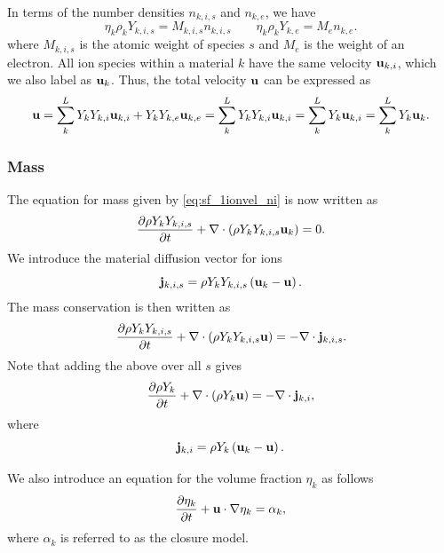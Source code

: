 \documentclass[a4paper,11pt]{report}
\begin{document}
In terms of the number densities $n_{k,i,s}$ and $n_{k,e}$, we have
\begin{equation}
    \label{eq:mm_mass_number_densities}
    \eta_k \rho_k Y_{k,i,s} = M_{k,i,s} n_{k,i,s} \qquad \eta_k \rho_k Y_{k,e} = M_e n_{k,e}.
\end{equation}
where $M_{k,i,s}$ is the atomic weight of species $s$ and $M_e$ is the weight of an electron. All ion species within a material $k$ have the same velocity $\mathbf{u}_{k,i}$, which we also label as $\mathbf{u}_k$. Thus, the total velocity $\mathbf{u}$ can be expressed as
\begin{equation}
    \label{eq:mm_common_vel}
    \mathbf{u} = \sum_k^L Y_k Y_{k,i} \mathbf{u}_{k,i} + Y_k Y_{k,e} \mathbf{u}_{k,e} = \sum_k^L Y_k Y_{k,i} \mathbf{u}_{k,i} = \sum_k^L Y_k \mathbf{u}_{k,i} = \sum_k^L Y_k \mathbf{u}_k.
\end{equation}

\subsubsection{Mass}

The equation for mass given by \cref{eq:sf_1ionvel_ni} is now written as
\begin{equation*}
    \frac{\partial \rho Y_k Y_{k,i,s}}{\partial t} + \nabla \cdot \left( \rho Y_k Y_{k,i,s} \mathbf{u}_k \right) = 0.
\end{equation*}
We introduce the material diffusion vector for ions 
\begin{equation}
    \label{eq:mm_mat_diffusion_species}
    \mathbf{j}_{k,i,s} = \rho Y_k Y_{k,i,s} \left( \mathbf{u}_k - \mathbf{u} \right). 
\end{equation}
The mass conservation is then written as
\begin{equation*}
    \frac{\partial \rho Y_k Y_{k,i,s}}{\partial t} + \nabla \cdot \left( \rho Y_k Y_{k,i,s} \mathbf{u} \right) = - \nabla \cdot \mathbf{j}_{k,i,s}.
\end{equation*}
Note that adding the above over all $s$ gives
\begin{equation*}
    \frac{\partial \rho Y_k}{\partial t} + \nabla \cdot \left( \rho Y_k \mathbf{u} \right) = - \nabla \cdot \mathbf{j}_{k,i},
\end{equation*}
where
\begin{equation}
    \label{eq:mm_mat_diffusion}
    \mathbf{j}_{k,i} = \rho Y_k \left( \mathbf{u}_k - \mathbf{u} \right).
\end{equation}

We also introduce an equation for the volume fraction $\eta_k$ as follows
\begin{equation*}
    \frac{\partial \eta_k}{\partial t} + \mathbf{u} \cdot \nabla \eta_k = \alpha_k,
\end{equation*}
where $\alpha_k$ is referred to as the closure model.
\end{document}
